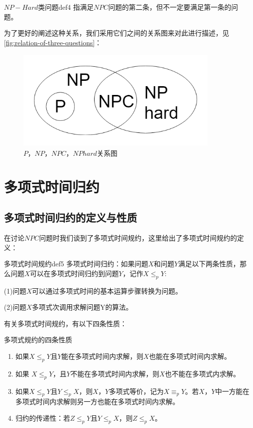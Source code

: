 	\begin{definition}{$NP-Hard$类问题}{def4}
		指满足$NPC$问题的第二条，但不一定要满足第一条的问题。
	\end{definition}
	
	为了更好的阐述这种关系，我们采用它们之间的关系图来对此进行描述，见\autoref{fig:relation-of-three-questions}：
	
	\begin{figure}[ht]
		\begin{minipage}[t]{1\linewidth}
			\centering
			\includegraphics[width=10cm,height=5cm]{image/P_NP1.png}
			\caption{$P$，$NP$，$NPC$，$NPhard$关系图}\label{fig:relation-of-three-questions}
		\end{minipage}
	\end{figure}
	
	\section{多项式时间归约}
	\subsection{多项式时间归约的定义与性质}
	在讨论$NPC$问题时我们谈到了多项式时间规约，这里给出了多项式时间规约的定义：
	\begin{definition}{多项式时间规约}{def5}
	多项式时间归约：如果问题$X$和问题$Y$满足以下两条性质，那么问题$X$可以在多项式时间归约到问题$Y$，记作$X\leq_pY$:
		
	(1)问题$X$可以通过多项式时间的基本运算步骤转换为问题。
	
	(2)问题$X$多项式次调用求解问题Y的算法。
	\end{definition}
	有关多项式时间规约，有以下四条性质：
	\begin{theorem}{多项式规约的四条性质}{}	
		\begin{enumerate}
			\item 如果$X\leq_pY$且$Y$能在多项式时间内求解，则$X$也能在多项式时间内求解。
			\item 如果 $X\leq_pY$，且$Y$不能在多项式时间内求解，则$X$也不能在多项式内求解。
			\item 如果$X\leq_pY$且$Y\leq_pX$，则$X$，$Y$多项式等价，记为$X\equiv_pY$。若$X$，$Y$中一方能在多项式时间内求解则另一方也能在多项式时间内求解。
			\item 归约的传递性：若$Z\leq_pY$且$Y\leq_pX$，则$Z\leq_pX$。
		\end{enumerate}
		
	\end{theorem}

